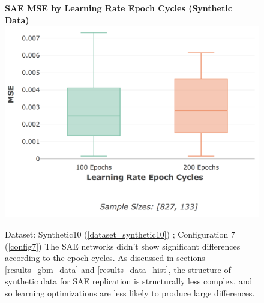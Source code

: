 \documentclass[a4paper,11pt,oneside]{article}
\theoremstyle{plain}
\theoremstyle{definition}
\begin{document}
	\begin{figure}[H]
		\centering 
		\textbf{SAE MSE by Learning Rate Epoch Cycles (Synthetic Data)}
		\includegraphics[scale=0.3]{images/results/network/lr/synth_mse_lr_epochs.png} 
		\caption[SAE MSE by Learning Rate Epoch Cycles (Synthetic Data)]{Dataset: Synthetic10 (\ref{dataset_synthetic10}) ; Configuration 7 (\ref{config7})
			\newline The SAE networks didn't show significant differences according to the epoch cycles. As discussed in sections \ref{results_gbm_data} and \ref{results_data_hist}, the structure of synthetic data for SAE replication is structurally less complex, and so learning optimizations are less likely to produce large differences.}
		\label{figure-synth_mse_lr_epochs}
	\end{figure}
	
\end{document}
